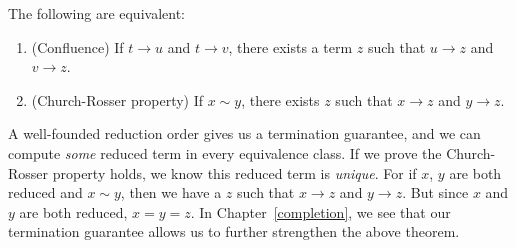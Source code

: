 \documentclass[../generics]{subfiles}
\begin{document}
\begin{theorem}\label{church rosser theorem}
The following are equivalent:
\begin{enumerate}
\item {}(Confluence) If $t\rightarrow u$ and $t\rightarrow v$, there exists a term $z$ such that $u\rightarrow z$ and $v\rightarrow z$.
\item {}(Church-Rosser property) If $x\sim y$, there exists $z$ such that $x\rightarrow z$ and $y\rightarrow z$.
\end{enumerate}
\end{theorem}
A well-founded reduction order gives us a termination guarantee, and we can compute \emph{some} reduced term in every equivalence class. If we prove the Church-Rosser property holds, we know this reduced term is \emph{unique}. For if $x$, $y$ are both reduced and $x\sim y$, then we have a $z$ such that $x\rightarrow z$ and $y\rightarrow z$. But since $x$ and $y$ are both reduced, $x=y=z$. In Chapter~\ref{completion}, we see that our termination guarantee allows us to further strengthen the above theorem.
\end{document}
